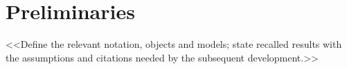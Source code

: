 \section{Preliminaries}\label{sec:prelim}
<<Define the relevant notation, objects and models; state recalled results with
the assumptions and citations needed by the subsequent development.>>
